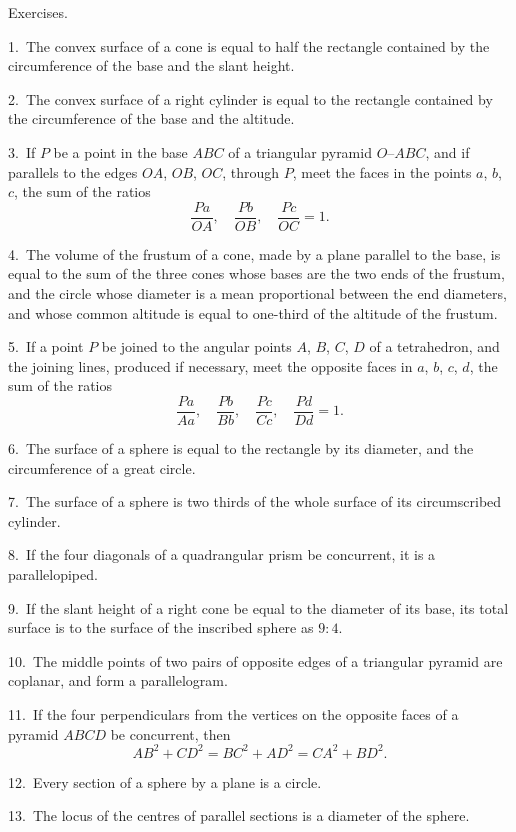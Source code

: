 \documentclass[oneside]{book}
\newcommand\exhead[1]{
\Needspace*{5\baselineskip}\begin{center}
\textsf{#1}
\end{center}
}
\begin{document}
\exhead{Exercises.}

\begin{footnotesize}
1.~The convex surface of a cone is equal to half the rectangle
contained by the circumference of the base and the slant height.

2.~The convex surface of a right cylinder is equal to the rectangle
contained by the circumference of the base and the altitude.

3.~If $P$ be a point in the base $ABC$ of a triangular pyramid
$O$--$ABC$, and if parallels to the edges $OA$, $OB$, $OC$, through $P$,
meet the faces in the points $a$, $b$, $c$, the sum of the ratios
\[
  \frac{Pa}{OA}, \quad
  \frac{Pb}{OB}, \quad
  \frac{Pc}{OC} = 1.
\]

4.~The volume of the frustum of a cone, made by a plane
parallel to the base, is equal to the sum of the three cones whose
bases are the two ends of the frustum, and the circle whose
diameter is a mean proportional between the end diameters, and
whose common altitude is equal to one-third of the altitude of the
frustum.

5.~If a point $P$ be joined to the angular points $A$, $B$, $C$, $D$ of a
tetrahedron, and the joining lines, produced if necessary, meet the
opposite faces in $a$, $b$, $c$, $d$, the sum of the ratios
\[
  \frac{Pa}{Aa}, \quad
  \frac{Pb}{Bb}, \quad
  \frac{Pc}{Cc}, \quad
  \frac{Pd}{Dd} = 1.
\]

6.~The surface of a sphere is equal to the rectangle by its
diameter, and the circumference of a great circle.

7.~The surface of a sphere is two thirds of the whole surface
of its circumscribed cylinder.

8.~If the four diagonals of a quadrangular prism be concurrent,
it is a parallelopiped.

9.~If the slant height of a right cone be equal to the diameter
of its base, its total surface is to the surface of the inscribed sphere
as $9 : 4$.

10.~The middle points of two pairs of opposite edges of a
triangular pyramid are coplanar, and form a parallelogram.

11.~If the four perpendiculars from the vertices on the opposite
faces of a pyramid $ABCD$ be concurrent, then
\[
AB^2 + CD^2 = BC^2 + AD^2 = CA^2 + BD^2.
\]

12.~Every section of a sphere by a plane is a circle.

13.~The locus of the centres of parallel sections is a diameter of
the sphere.


\end{footnotesize}
\end{document}

